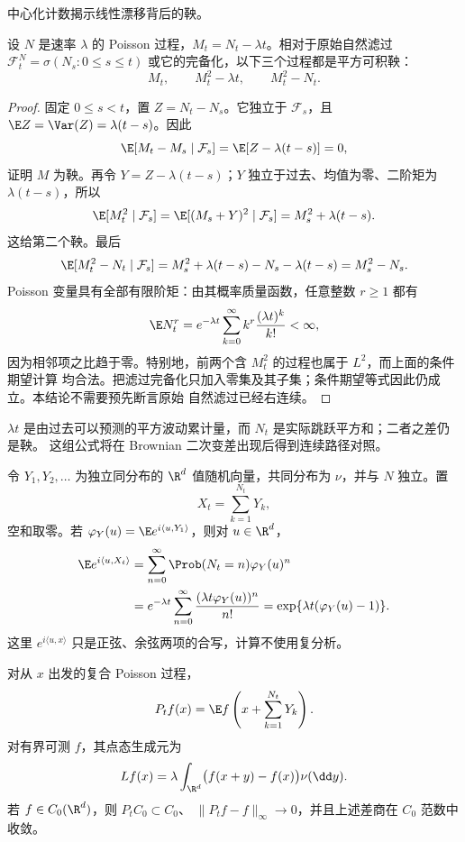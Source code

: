 中心化计数揭示线性漂移背后的鞅。

\begin{theorem}\label{theorem:6-3-3-3}
设 $N$ 是速率 $\lambda$ 的 Poisson 过程，$M_t=N_t-\lambda t$。相对于原始自然滤过
$\mathcal F_t^N=\sigma(N_s:0\le s\le t)$ 或它的完备化，以下三个过程都是平方可积鞅：
\[
 M_t,\qquad M_t^2-\lambda t,\qquad M_t^2-N_t.
\]
\end{theorem}

\begin{proof}
固定 $0\leq s<t$，置 $Z=N_t-N_s$。它独立于 $\mathcal F_s$，且
$\E Z=\Var(Z)=\lambda(t-s)$。因此
\[
 \E[M_t-M_s\mid\mathcal F_s]=\E[Z-\lambda(t-s)]=0,
\]
证明 $M$ 为鞅。再令 $Y=Z-\lambda(t-s)$；$Y$ 独立于过去、均值为零、二阶矩为
$\lambda(t-s)$，所以
\[
 \E[M_t^2\mid\mathcal F_s]
 =\E[(M_s+Y)^2\mid\mathcal F_s]
 =M_s^2+\lambda(t-s).
\]
这给第二个鞅。最后
\[
 \E[M_t^2-N_t\mid\mathcal F_s]
 =M_s^2+\lambda(t-s)-N_s-\lambda(t-s)
 =M_s^2-N_s.
\]
Poisson 变量具有全部有限阶矩：由其概率质量函数，任意整数 $r\ge1$ 都有
\[
 \E N_t^r=e^{-\lambda t}\sum_{k=0}^\infty
 k^r\frac{(\lambda t)^k}{k!}<\infty,
\]
因为相邻项之比趋于零。特别地，前两个含 $M_t^2$ 的过程也属于 $L^2$，而上面的条件期望计算
均合法。把滤过完备化只加入零集及其子集；条件期望等式因此仍成立。本结论不需要预先断言原始
自然滤过已经右连续。
\end{proof}

$\lambda t$ 是由过去可以预测的平方波动累计量，而 $N_t$ 是实际跳跃平方和；二者之差仍是鞅。
这组公式将在 Brownian 二次变差出现后得到连续路径对照。

\begin{example}[复合 Poisson 过程]\label{ex:6-3-3-2}
令 $Y_1,Y_2,\ldots$ 为独立同分布的 $\R^d$ 值随机向量，共同分布为 $\nu$，并与 $N$ 独立。置
\[
 X_t=\sum_{k=1}^{N_t}Y_k,
\]
空和取零。若 $\varphi_Y(u)=\E e^{i\langle u,Y_1\rangle}$，则对 $u\in\R^d$，
\begin{align*}
 \E e^{i\langle u,X_t\rangle}
 &=\sum_{n=0}^\infty\Prob(N_t=n)\varphi_Y(u)^n\\
 &=e^{-\lambda t}\sum_{n=0}^\infty\frac{(\lambda t\varphi_Y(u))^n}{n!}
 =\exp\{\lambda t(\varphi_Y(u)-1)\}.
\end{align*}
这里 $e^{i\langle u,x\rangle}$ 只是正弦、余弦两项的合写，计算不使用复分析。
\end{example}

\begin{proposition}\label{proposition:6-3-3-compound-generator}
对从 $x$ 出发的复合 Poisson 过程，
\[
 P_tf(x)=\E f\left(x+\sum_{k=1}^{N_t}Y_k\right).
\]
对有界可测 $f$，其点态生成元为
\[
 Lf(x)=\lambda\int_{\R^d}\bigl(f(x+y)-f(x)\bigr)\nu(\dd y).
\]
若 $f\in C_0(\R^d)$，则 $P_tC_0\subset C_0$、
$\|P_tf-f\|_\infty\to0$，并且上述差商在 $C_0$ 范数中收敛。
\end{proposition}

